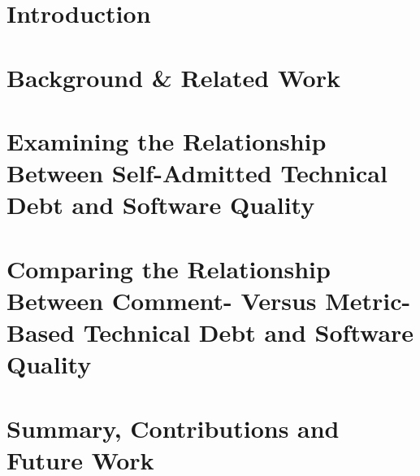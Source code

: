 \documentclass[12pt]{report}
\begin{document}
\chapter{Introduction}
\label{introduction}



\chapter{Background \& Related Work}
\label{literature_review}


\chapter{Examining the Relationship Between Self-Admitted Technical Debt and Software Quality}
\label{chapter3}


\chapter{Comparing the Relationship Between Comment- Versus Metric-Based Technical Debt and Software Quality}
\label{chapter4}


\chapter{Summary, Contributions and Future Work}
\label{conclusion}



\begin{appendices}
	\label{appendix}
	
\end{appendices}

  

\end{document}
